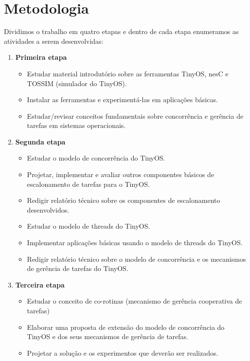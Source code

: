 \documentclass[a4paper,onecolumn, 10pt]{article}
\begin{document}
\section{Metodologia}\label{metodologia}
Dividimos o trabalho em quatro etapas e dentro de cada etapa enumeramos as atividades
a serem desenvolvidas: 
\begin{enumerate}
\item {\bf Primeira etapa} %
\begin{itemize}
  \item Estudar material introdutório sobre as ferramentas TinyOS, nesC e TOSSIM (simulador do TinyOS).
  \item Instalar as ferramentas e experimentá-las em aplicações básicas.
  \item Estudar/revisar conceitos fundamentais sobre concorrência e gerência de tarefas em sistemas operacionais.
\end{itemize}
\item {\bf Segunda etapa} %
\begin{itemize}
  \item Estudar o modelo de concorrência do TinyOS.
  \item Projetar, implementar e avaliar outros componentes básicos de escalonamento de
  tarefas para o TinyOS.
  \item Redigir relatório técnico sobre os componentes de escalonamento desenvolvidos.
  \item Estudar o modelo de threads do TinyOS.
  \item Implementar aplicações básicas usando o modelo de threads do TinyOS.
  \item Redigir relatório técnico sobre o modelo de concorrência e os mecanismos de gerência de tarefas do TinyOS.
\end{itemize}
\item {\bf Terceira etapa} %
\begin{itemize}
  \item Estudar o conceito de co-rotinas (mecanismo de gerência cooperativa de tarefas)
  \item Elaborar uma proposta de extensão do modelo de concorrência do TinyOS e
  dos seus mecanismos de gerência de tarefas.
  \item Projetar a solução e os experimentos que deverão ser realizados.

\end{itemize}
\end{enumerate}
\end{document}
